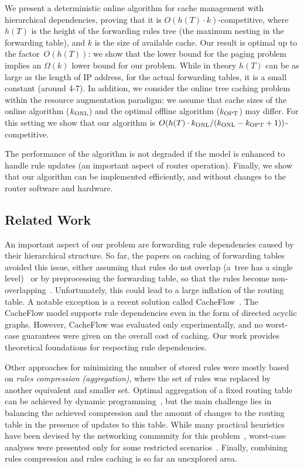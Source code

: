 We present a deterministic online algorithm for cache management with hierarchical dependencies, proving that it is
$O(h(T)\cdot k)$-competitive, where $h(T)$ is the height of the forwarding rules tree (the maximum nesting in the forwarding table), and $k$ is the size of available cache.
Our result is optimal up to the factor~$O(h(T))$: we show that the lower
bound for the paging problem~\cite{competitive-analysis} implies an
$\Omega(k)$ lower bound for our problem.
While in theory $h(T)$ can be as large as the length of IP address, for the actual forwarding tables, it is a small constant (around 4-7).
In addition, we consider the online tree caching problem within the resource
augmentation paradigm: we assume that cache sizes of the online algorithm
($k_\textnormal{ONL}$)  and the optimal offline algorithm ($k_\textnormal{OPT}$) may differ.
For this setting we show that our algorithm is
$O(h(T) \cdot k_\textnormal{ONL}/(k_\textnormal{ONL}-k_\textnormal{OPT}+1))$-competitive.


The performance of the algorithm is not degraded if the model is enhanced to handle rule updates (an important aspect of router operation).
Finally, we show that our algorithm can be implemented efficiently, and without changes to the router software and hardware.

\subsection{Related Work}

An important aspect of our problem are forwarding rule dependencies caused by their hierarchical structure.
So far, the papers on caching of forwarding tables avoided this issue, either assuming
that rules do not overlap (a~tree has a single level)~\cite{route-caching-flat} 
or by preprocessing the forwarding table, so that the rules become
non-overlapping~\cite{prefix-caching,fib-caching-non-overlapping}.
Unfortunately, this could lead to a large inflation of the routing table. A
notable exception is a recent solution called CacheFlow~\cite{cacheflow}. The
CacheFlow model supports rule  dependencies even in the form of directed acyclic
graphs. However, CacheFlow was evaluated only experimentally, and no
worst-case guarantees were given on the overall cost of caching. Our work
provides theoretical foundations for respecting rule dependencies.


Other approaches for minimizing the number of stored rules were mostly based
on \emph{rules compression (aggregation)}, where the set of rules was replaced
by another equivalent and smaller set. Optimal aggregation of a fixed routing
table can be achieved by dynamic
programming~\cite{ortc,fib-compression-two-dimensional}, but the main
challenge lies in balancing the achieved compression and the amount of changes
to the routing table in the presence of updates to this table. While
many practical heuristics have been devised by the networking community for
this problem~\cite{mms,fib-compression-fifa,fib-compression-globecom10,fib-compression-infocom13,fib-sigcomm,fib-compression-smalta,fib-compression-infocom10},
worst-case analyses were presented only for some restricted
scenarios~\cite{fib-icdcs,fib-sirocco}. Finally, combining rules compression and rules
caching is so far an unexplored area.



